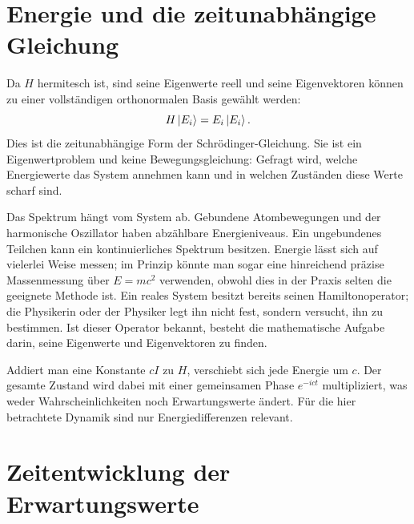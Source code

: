 \begin{classroomqa}\end{classroomqa}

\section{Energie und die zeitunabhängige Gleichung}

Da \(H\) hermitesch ist, sind seine Eigenwerte reell und seine Eigenvektoren können zu einer vollständigen orthonormalen Basis gewählt werden:
\begin{equation}
H\left\lvert E_i\right\rangle=E_i\left\lvert E_i\right\rangle.
\label{eq:l5-time-independent}
\end{equation}
Dies ist die zeitunabhängige Form der Schr\"odinger-Gleichung. Sie ist ein Eigenwertproblem und keine Bewegungsgleichung: Gefragt wird, welche Energiewerte das System annehmen kann und in welchen Zuständen diese Werte scharf sind.

Das Spektrum hängt vom System ab. Gebundene Atombewegungen und der harmonische Oszillator haben abzählbare Energieniveaus. Ein ungebundenes Teilchen kann ein kontinuierliches Spektrum besitzen. Energie lässt sich auf vielerlei Weise messen; im Prinzip könnte man sogar eine hinreichend präzise Massenmessung über \(E=mc^2\) verwenden, obwohl dies in der Praxis selten die geeignete Methode ist. Ein reales System besitzt bereits seinen Hamiltonoperator; die Physikerin oder der Physiker legt ihn nicht fest, sondern versucht, ihn zu bestimmen. Ist dieser Operator bekannt, besteht die mathematische Aufgabe darin, seine Eigenwerte und Eigenvektoren zu finden.

Addiert man eine Konstante \(cI\) zu \(H\), verschiebt sich jede Energie um \(c\). Der gesamte Zustand wird dabei mit einer gemeinsamen Phase \(e^{-ict}\) multipliziert, was weder Wahrscheinlichkeiten noch Erwartungswerte ändert. Für die hier betrachtete Dynamik sind nur Energiedifferenzen relevant.

\section{Zeitentwicklung der Erwartungswerte}

